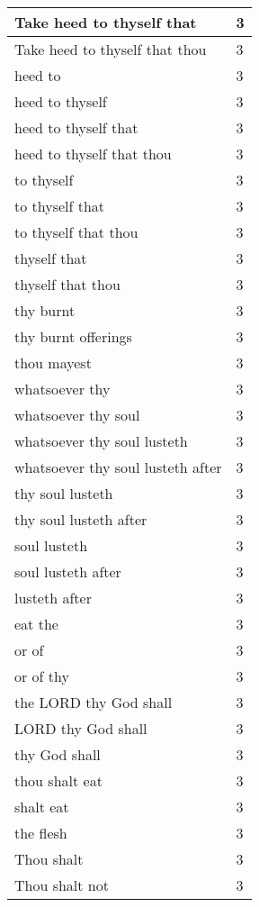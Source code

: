 \begin{center}
\begin{longtable}{|p{3.0in}|p{0.5in}|}
Take heed to thyself that & 3\\ \hline 
Take heed to thyself that thou & 3\\ \hline 
heed to & 3\\ \hline 
heed to thyself & 3\\ \hline 
heed to thyself that & 3\\ \hline 
heed to thyself that thou & 3\\ \hline 
to thyself & 3\\ \hline 
to thyself that & 3\\ \hline 
to thyself that thou & 3\\ \hline 
thyself that & 3\\ \hline 
thyself that thou & 3\\ \hline 
thy burnt & 3\\ \hline 
thy burnt offerings & 3\\ \hline 
thou mayest & 3\\ \hline 
whatsoever thy & 3\\ \hline 
whatsoever thy soul & 3\\ \hline 
whatsoever thy soul lusteth & 3\\ \hline 
whatsoever thy soul lusteth after & 3\\ \hline 
thy soul lusteth & 3\\ \hline 
thy soul lusteth after & 3\\ \hline 
soul lusteth & 3\\ \hline 
soul lusteth after & 3\\ \hline 
lusteth after & 3\\ \hline 
eat the & 3\\ \hline 
or of & 3\\ \hline 
or of thy & 3\\ \hline 
the LORD thy God shall & 3\\ \hline 
LORD thy God shall & 3\\ \hline 
thy God shall & 3\\ \hline 
thou shalt eat & 3\\ \hline 
shalt eat & 3\\ \hline 
the flesh & 3\\ \hline 
Thou shalt & 3\\ \hline 
Thou shalt not & 3\\ \hline 
\end{longtable}
\end{center}





